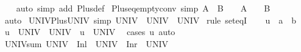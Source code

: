 \begin{isabellebody}
\ \ %
\endisadelimproof
%
\isatagproof
{}\isamarkupfalse%
\ {\isacharparenleft}{\kern0pt}auto\ simp\ add{\isacharcolon}{\kern0pt}\ Plus{\isacharunderscore}{\kern0pt}def{\isacharparenright}{\kern0pt}%
\endisatagproof
{\isafoldproof}%
%
\isadelimproof
\isanewline
%
\endisadelimproof
\isanewline
{}\isamarkupfalse%
\ Plus{\isacharunderscore}{\kern0pt}eq{\isacharunderscore}{\kern0pt}empty{\isacharunderscore}{\kern0pt}conv\ {\isacharbrackleft}{\kern0pt}simp{\isacharbrackright}{\kern0pt}{\isacharcolon}{\kern0pt}\ {\isachardoublequoteopen}A\ {\isacharless}{\kern0pt}{\isacharplus}{\kern0pt}{\isachargreater}{\kern0pt}\ B\ {\isacharequal}{\kern0pt}\ {\isacharbraceleft}{\kern0pt}{\isacharbraceright}{\kern0pt}\ {\isasymlongleftrightarrow}\ A\ {\isacharequal}{\kern0pt}\ {\isacharbraceleft}{\kern0pt}{\isacharbraceright}{\kern0pt}\ {\isasymand}\ B\ {\isacharequal}{\kern0pt}\ {\isacharbraceleft}{\kern0pt}{\isacharbraceright}{\kern0pt}{\isachardoublequoteclose}\isanewline
%
\isadelimproof
\ \ %
\endisadelimproof
%
\isatagproof
{}\isamarkupfalse%
\ auto%
\endisatagproof
{\isafoldproof}%
%
\isadelimproof
\isanewline
%
\endisadelimproof
\isanewline
{}\isamarkupfalse%
\ UNIV{\isacharunderscore}{\kern0pt}Plus{\isacharunderscore}{\kern0pt}UNIV\ {\isacharbrackleft}{\kern0pt}simp{\isacharbrackright}{\kern0pt}{\isacharcolon}{\kern0pt}\ {\isachardoublequoteopen}UNIV\ {\isacharless}{\kern0pt}{\isacharplus}{\kern0pt}{\isachargreater}{\kern0pt}\ UNIV\ {\isacharequal}{\kern0pt}\ UNIV{\isachardoublequoteclose}\isanewline
%
\isadelimproof
%
\endisadelimproof
%
\isatagproof
{}\isamarkupfalse%
\ {\isacharparenleft}{\kern0pt}rule\ set{\isacharunderscore}{\kern0pt}eqI{\isacharparenright}{\kern0pt}\isanewline
\ \ \isamarkupfalse%
\ u\ {\isacharcolon}{\kern0pt}{\isacharcolon}{\kern0pt}\ {\isachardoublequoteopen}{\isacharprime}{\kern0pt}a\ {\isacharplus}{\kern0pt}\ {\isacharprime}{\kern0pt}b{\isachardoublequoteclose}\isanewline
\ \ \isamarkupfalse%
\ {\isachardoublequoteopen}u\ {\isasymin}\ UNIV\ {\isacharless}{\kern0pt}{\isacharplus}{\kern0pt}{\isachargreater}{\kern0pt}\ UNIV\ {\isasymlongleftrightarrow}\ u\ {\isasymin}\ UNIV{\isachardoublequoteclose}\ \isamarkupfalse%
\ {\isacharparenleft}{\kern0pt}cases\ u{\isacharparenright}{\kern0pt}\ auto\isanewline
{}\isamarkupfalse%
%
\endisatagproof
{\isafoldproof}%
%
\isadelimproof
\isanewline
%
\endisadelimproof
\isanewline
{}\isamarkupfalse%
\ UNIV{\isacharunderscore}{\kern0pt}sum{\isacharcolon}{\kern0pt}\ {\isachardoublequoteopen}UNIV\ {\isacharequal}{\kern0pt}\ Inl\ {\isacharbackquote}{\kern0pt}\ UNIV\ {\isasymunion}\ Inr\ {\isacharbackquote}{\kern0pt}\ UNIV{\isachardoublequoteclose}\isanewline

\end{isabellebody}
